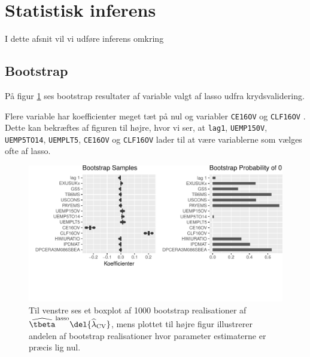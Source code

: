 \section{Statistisk inferens}
I dette afsnit vil vi udføre inferens omkring


\subsection{Bootstrap}
På figur \ref{fig:bootstrap_lasso} ses bootstrap resultater af variable valgt af lasso udfra krydsvalidering.

Flere variable har koefficienter meget tæt på nul og 
variabler \texttt{CE16OV} og \texttt{CLF16OV} .
Dette kan bekræftes af figuren til højre, hvor vi ser, at \texttt{lag1}, \texttt{UEMP150V}, \texttt{UEMP5TO14}, \texttt{UEMPLT5}, \texttt{CE16OV} og \texttt{CLF16OV} lader til at være variablerne som vælges ofte af lasso.
%
\begin{figure}[h]
\includegraphics[scale=0.8, clip, trim=0 2.5cm 0 0]{fig/img/bootstrap_lasso.pdf}
\caption{Til venstre ses et boxplot af 1000 bootstrap realisationer af \(\widehat{\tbeta}^\text{lasso} \del{\widehat{\lambda}_\text{CV}}\), mens plottet til højre figur illustrerer andelen af bootstrap realisationer hvor parameter estimaterne er præcis lig nul.}
\label{fig:bootstrap_lasso}
\end{figure}
%



%
%
%
%




